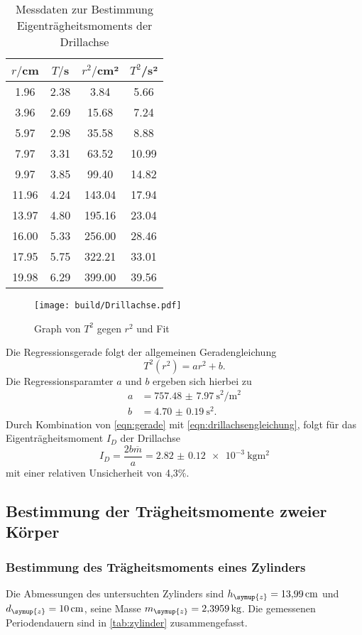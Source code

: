 \begin{table}
\centering
\caption{Messdaten zur Bestimmung Eigenträgheitsmoments der Drillachse}
\label{tab:drillachse}
\begin{tabular}{c c c c}
\toprule
$r/$cm & $T/$s & $r^2/$cm² & $T^2$/s² \\
\midrule
 1.96 & 2.38 &   3.84 &  5.66 \\
 3.96 & 2.69 &  15.68 &  7.24 \\
 5.97 & 2.98 &  35.58 &  8.88 \\
 7.97 & 3.31 &  63.52 & 10.99 \\
 9.97 & 3.85 &  99.40 & 14.82 \\
11.96 & 4.24 & 143.04 & 17.94 \\
13.97 & 4.80 & 195.16 & 23.04 \\
16.00 & 5.33 & 256.00 & 28.46 \\
17.95 & 5.75 & 322.21 & 33.01 \\
19.98 & 6.29 & 399.00 & 39.56 \\
\bottomrule
\end{tabular}
\end{table}
\begin{figure}
  \centering
  \texttt{[image: build/Drillachse.pdf]}
  \caption{Graph von $T^2$ gegen $r^2$ und Fit}
  \label{fig:drillachse}
\end{figure}
Die Regressionsgerade folgt der allgemeinen Geradengleichung
\begin{equation}
  T^2(r^2) = ar^2+b.
  \label{eqn:gerade}
\end{equation}
Die Regressionsparamter $a$ und $b$ ergeben sich hierbei zu
\begin{align}
  a &= \SI{757.48(797)}{\second\squared/\meter\squared}\\
  b &= \SI{4.70(019)}{\second\squared}.
\end{align}
Durch Kombination von \eqref{eqn:gerade} mit \eqref{eqn:drillachsengleichung},
folgt für das Eigenträgheitsmoment $I_D$ der Drillachse
\begin{equation}
  I_D = \frac{2b\overline{m}}{a} = \SI{2.82(012)e-3}{\kilogram\meter\squared}
\end{equation}
mit einer relativen Unsicherheit von 4,3\%.
\subsection{Bestimmung der Trägheitsmomente zweier Körper}
\subsubsection{Bestimmung des Trägheitsmoments eines Zylinders}
Die Abmessungen des untersuchten Zylinders sind $h_{\symup{z}}=\SI{13.99}{\cm}$ und
$d_{\symup{z}}=\SI{10}{\cm}$, seine Masse $m_{\symup{z}}=\SI{2.3959}{\kilogram}$.
Die gemessenen Periodendauern sind in \ref{tab:zylinder} zusammengefasst.

